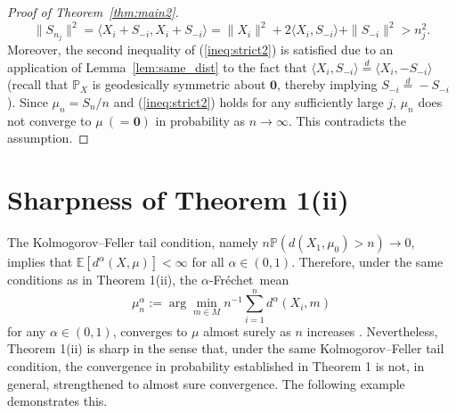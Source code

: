 \documentclass[preprint]{imsart}
\def\Frechet{Fr\'{e}chet}
\theoremstyle{plain}
\theoremstyle{remark}
\begin{document}
\begin{appendix}
\begin{proof}[Proof of Theorem~\ref{thm:main2}]
$$
\|S_{n_{j}}\|^2=\langle X_i + S_{-i}, X_i+S_{-i} \rangle =\|X_i\|^2 + 2\langle X_i, S_{-i} \rangle +\|S_{-i} \|^2 > n_j^2.
$$
Moreover, the second inequality of (\ref{ineq:strict2}) is satisfied due to an application of Lemma~\ref{lem:same_dist} to the fact that $\langle X_i, S_{-i}\rangle \overset{d}{=} \langle X_i, -S_{-i} \rangle$ (recall that $\mathbb{P}_{X}$ is geodesically symmetric about $\mathbf{0}$, thereby implying $S_{-i}\overset{d}{=}-S_{-i}$). Since $\mu_n=S_n/n$ and (\ref{ineq:strict2}) holds for any sufficiently large $j$, $\mu_n$ does not converge to $\mu ~(=\mathbf{0})$ in probability as $n\to \infty$. This contradicts the assumption.
\end{proof}


\section{Sharpness of Theorem 1(ii)} %

The Kolmogorov--Feller tail condition, namely $n\mathbb{P}(d(X_1, \mu_0) > n) \to 0$, implies that $\mathbb{E}[d^{\alpha}(X, \mu)] <\infty$ for all $\alpha \in (0, 1)$. Therefore, under the same conditions as in Theorem 1(ii), the $\alpha$-\Frechet\ mean 
$$\mu_n^{\alpha}:=\arg\min_{m \in M} n^{-1}\sum_{i=1}^{n}d^\alpha(X_i, m)$$ 
for any $\alpha \in (0,1)$, converges to $\mu$ almost surely as $n$ increases \cite[][Corollary 5.2]{schotz2022strong}. Nevertheless, Theorem 1(ii) is sharp in the sense that, under the same Kolmogorov--Feller tail condition, the convergence in probability established in Theorem 1 is not, in general, strengthened to almost sure convergence. The following example demonstrates this.


\end{appendix}
\end{document}
